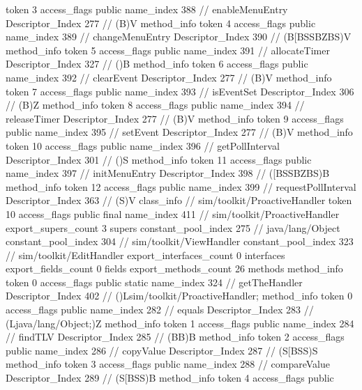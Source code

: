 {{{{{					token	3
					access_flags	public
					name_index	388		// enableMenuEntry
					Descriptor_Index	277		// (B)V
				}
				method_info {
					token	4
					access_flags	public
					name_index	389		// changeMenuEntry
					Descriptor_Index	390		// (B[BSSBZBS)V
				}
				method_info {
					token	5
					access_flags	public
					name_index	391		// allocateTimer
					Descriptor_Index	327		// ()B
				}
				method_info {
					token	6
					access_flags	public
					name_index	392		// clearEvent
					Descriptor_Index	277		// (B)V
				}
				method_info {
					token	7
					access_flags	public
					name_index	393		// isEventSet
					Descriptor_Index	306		// (B)Z
				}
				method_info {
					token	8
					access_flags	public
					name_index	394		// releaseTimer
					Descriptor_Index	277		// (B)V
				}
				method_info {
					token	9
					access_flags	public
					name_index	395		// setEvent
					Descriptor_Index	277		// (B)V
				}
				method_info {
					token	10
					access_flags	public
					name_index	396		// getPollInterval
					Descriptor_Index	301		// ()S
				}
				method_info {
					token	11
					access_flags	public
					name_index	397		// initMenuEntry
					Descriptor_Index	398		// ([BSSBZBS)B
				}
				method_info {
					token	12
					access_flags	public
					name_index	399		// requestPollInterval
					Descriptor_Index	363		// (S)V
				}
			}
		}
		class_info {		// sim/toolkit/ProactiveHandler
			token	10
			access_flags	public final
			name_index	411		// sim/toolkit/ProactiveHandler
			export_supers_count	3
			supers {
				constant_pool_index	275		// java/lang/Object
				constant_pool_index	304		// sim/toolkit/ViewHandler
				constant_pool_index	323		// sim/toolkit/EditHandler
			}
			export_interfaces_count	0
			interfaces {
			}
			export_fields_count	0
			fields {
			}
			export_methods_count	26
			methods {
				method_info {
					token	0
					access_flags	public static
					name_index	324		// getTheHandler
					Descriptor_Index	402		// ()Lsim/toolkit/ProactiveHandler;
				}
				method_info {
					token	0
					access_flags	public
					name_index	282		// equals
					Descriptor_Index	283		// (Ljava/lang/Object;)Z
				}
				method_info {
					token	1
					access_flags	public
					name_index	284		// findTLV
					Descriptor_Index	285		// (BB)B
				}
				method_info {
					token	2
					access_flags	public
					name_index	286		// copyValue
					Descriptor_Index	287		// (S[BSS)S
				}
				method_info {
					token	3
					access_flags	public
					name_index	288		// compareValue
					Descriptor_Index	289		// (S[BSS)B
				}
				method_info {
					token	4
					access_flags	public
}}}}}
